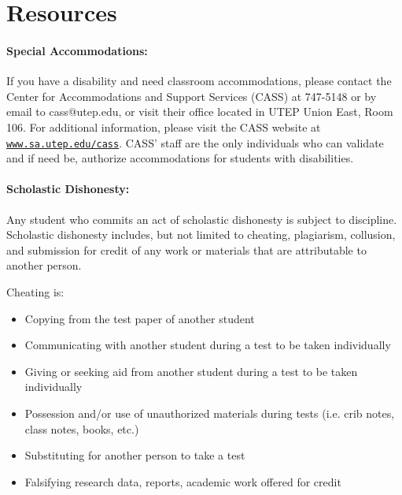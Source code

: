 \section{Resources}

\paragraph{Special Accommodations: }
If you have a disability and need classroom accommodations, please contact the Center for Accommodations and Support Services (CASS) at 747-5148 or by email to cass@utep.edu, or visit their office located in UTEP Union East, Room 106. For additional information, please visit the CASS website at \href{http://www.sa.utep.edu/cass}{\texttt{www.sa.utep.edu/cass}}. CASS’ staff are the only individuals who can validate and if need be, authorize accommodations for students with disabilities.


\paragraph{Scholastic Dishonesty: }
Any student who commits an act of scholastic dishonesty is subject to discipline. Scholastic dishonesty includes, but not limited to cheating, plagiarism, collusion, and submission for credit of any work or materials that are attributable to another person.

Cheating is:
\begin{itemize}
\item Copying from the test paper of another student
\item Communicating with another student during a test to be taken individually
\item Giving or seeking aid from another student during a test to be taken individually
\item Possession and/or use of unauthorized materials during tests (i.e. crib notes, class notes, books, etc.)
\item Substituting for another person to take a test
\item Falsifying research data, reports, academic work offered for credit
\end{itemize}

